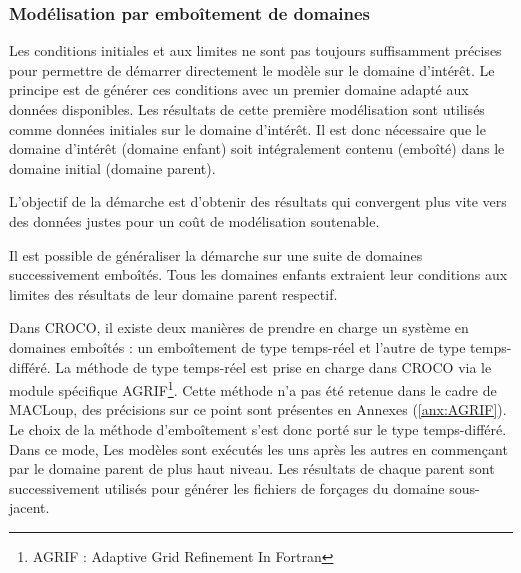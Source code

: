 \documentclass[10pt,a4paper,titlepage]{article}
\begin{document}
    \subsubsection{Modélisation par emboîtement de domaines}
    \label{subsub:enchainement_modelisations}
    
    Les conditions initiales et aux limites ne sont pas toujours suffisamment précises pour permettre de démarrer directement le modèle sur le domaine d'intérêt.
    Le principe est de générer ces conditions avec un premier domaine adapté aux données disponibles.
    Les résultats de cette première modélisation sont utilisés comme données initiales sur le domaine d'intérêt.
    Il est donc nécessaire que le domaine d'intérêt (domaine enfant) soit intégralement contenu (emboîté) dans le domaine initial (domaine parent).
    
    L'objectif de la démarche est d'obtenir des résultats qui convergent plus vite vers des données justes pour un coût de modélisation soutenable.
    
    Il est possible de généraliser la démarche sur une suite de domaines successivement emboîtés.
    Tous les domaines enfants extraient leur conditions aux limites des résultats de leur domaine parent respectif.
    
    Dans CROCO, il existe deux manières de prendre en charge un système en domaines emboîtés : un emboîtement de type temps-réel et l'autre de type temps-différé.
    La méthode de type temps-réel est prise en charge dans CROCO via le module spécifique AGRIF\footnote{AGRIF : Adaptive Grid Refinement In Fortran}.
    Cette méthode n'a pas été retenue dans le cadre de MACLoup, des précisions sur ce point sont présentes en Annexes (\ref{anx:AGRIF}).
    Le choix de la méthode d'emboîtement s'est donc porté sur le type temps-différé.
    Dans ce mode, Les modèles sont exécutés les uns après les autres en commençant par le domaine parent de plus haut niveau.
    Les résultats de chaque parent sont successivement utilisés pour générer les fichiers de forçages du domaine sous-jacent.
    
\end{document}
